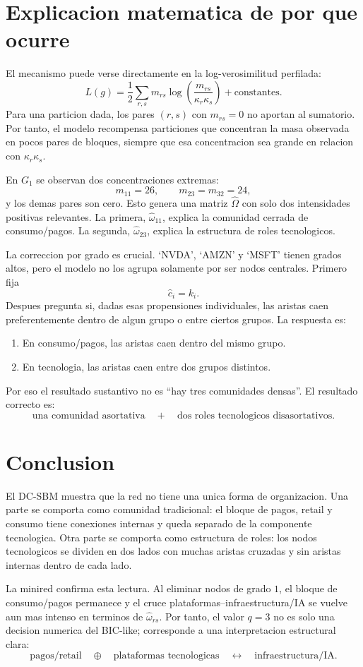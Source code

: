 \documentclass[11pt,letterpaper]{article}
\begin{document}
\section{Explicacion matematica de por que ocurre}

El mecanismo puede verse directamente en la log-verosimilitud perfilada:
\[
    L(g)
    =
    \frac{1}{2}\sum_{r,s}
    m_{rs}\log\left(\frac{m_{rs}}{\kappa_r\kappa_s}\right)
    +\text{constantes}.
\]
Para una particion dada, los pares $(r,s)$ con $m_{rs}=0$ no aportan al sumatorio. Por tanto, el modelo recompensa particiones que concentran la masa observada en pocos pares de bloques, siempre que esa concentracion sea grande en relacion con $\kappa_r\kappa_s$.

En $G_1$ se observan dos concentraciones extremas:
\[
    m_{11}=26,
    \qquad
    m_{23}=m_{32}=24,
\]
y los demas pares son cero. Esto genera una matriz $\hat\Omega$ con solo dos intensidades positivas relevantes. La primera, $\hat\omega_{11}$, explica la comunidad cerrada de consumo/pagos. La segunda, $\hat\omega_{23}$, explica la estructura de roles tecnologicos.

La correccion por grado es crucial. `NVDA', `AMZN' y `MSFT' tienen grados altos, pero el modelo no los agrupa solamente por ser nodos centrales. Primero fija
\[
    \hat c_i=k_i.
\]
Despues pregunta si, dadas esas propensiones individuales, las aristas caen preferentemente dentro de algun grupo o entre ciertos grupos. La respuesta es:
\begin{enumerate}
    \item En consumo/pagos, las aristas caen dentro del mismo grupo.
    \item En tecnologia, las aristas caen entre dos grupos distintos.
\end{enumerate}

Por eso el resultado sustantivo no es ``hay tres comunidades densas''. El resultado correcto es:
\[
    \text{una comunidad asortativa}
    \quad+\quad
    \text{dos roles tecnologicos disasortativos}.
\]

\section{Conclusion}

El DC-SBM muestra que la red no tiene una unica forma de organizacion. Una parte se comporta como comunidad tradicional: el bloque de pagos, retail y consumo tiene conexiones internas y queda separado de la componente tecnologica. Otra parte se comporta como estructura de roles: los nodos tecnologicos se dividen en dos lados con muchas aristas cruzadas y sin aristas internas dentro de cada lado.

La minired confirma esta lectura. Al eliminar nodos de grado $1$, el bloque de consumo/pagos permanece y el cruce plataformas--infraestructura/IA se vuelve aun mas intenso en terminos de $\hat\omega_{rs}$. Por tanto, el valor $q=3$ no es solo una decision numerica del BIC-like; corresponde a una interpretacion estructural clara:
\[
    \boxed{
    \text{pagos/retail}
    \quad\oplus\quad
    \text{plataformas tecnologicas}
    \quad\leftrightarrow\quad
    \text{infraestructura/IA}
    }.
\]
\end{document}
